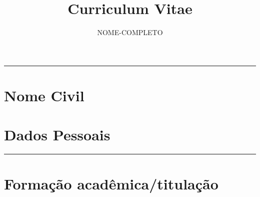 \documentclass[10pt,
			   a4paper,
			   twoside,
			   extrafontsizes,
			   openright,
			   oldfontcommands]{memoir}
\title{Curriculum Vitae}
\author{NOME-COMPLETO} %
\date{\monthyeardate}
\def\maketitle{%
	\null
	\thispagestyle{empty}%
	\vfill
	\begin{center}
		\vspace{46mm} %
		{\fontsize{13}{16}\selectfont \textcolor{cinza}{\textbf{\theauthor}}\par}%
		{\thetitle\par}%
		\vspace{100mm} %
		{\thedate\par}%
	\end{center}%
	\null
	\cleardoublepage
}
\DeclareRobustCommand{\linha}{
	\noindent\hfil\rule[-1mm]{\textwidth}{0.2mm}\hfil
}
\begin{document}
	\maketitle

	\mainmatter
	{\fontsize{13}{16}\selectfont \textcolor{cinza}{\textbf{\theauthor}}}\par
	\thetitle\par
	\linha
	\section*{Nome Civil}
	\section*{Dados Pessoais}
	\linha
	\section*{Formação acadêmica/titulação}
	
\end{document}
